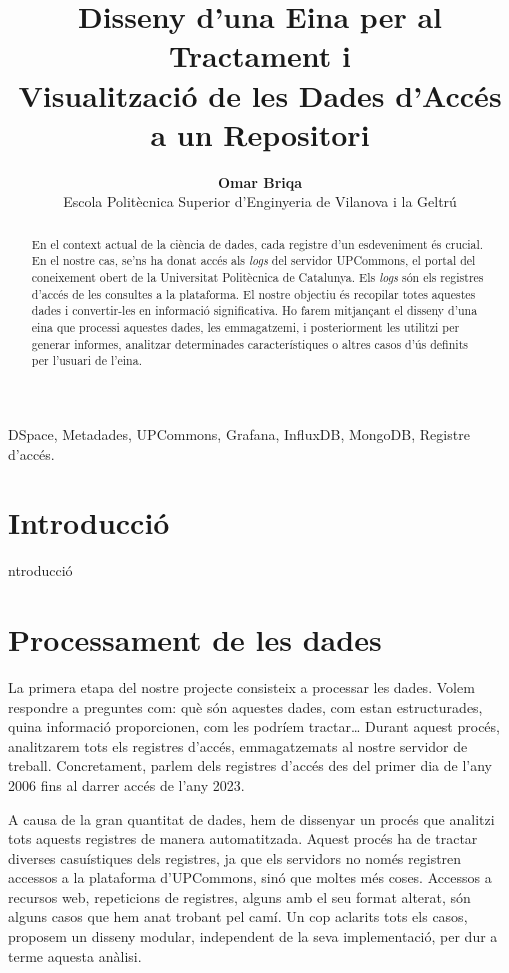 \documentclass[lettersize,journal]{IEEEtran}
\begin{document}
\title{Disseny d'una Eina per al Tractament i \\ Visualització de les Dades d'Accés a un Repositori}
\author{\textbf{Omar Briqa} \\ \vspace{5pt} Escola Politècnica Superior d'Enginyeria de Vilanova i la Geltrú}
\maketitle

\begin{abstract}
En el context actual de la ciència de dades, cada registre d'un esdeveniment és crucial.
En el nostre cas, se'ns ha donat accés als \textit{logs} del servidor UPCommons, el portal del coneixement obert de la Universitat Politècnica de Catalunya.
Els \textit{logs} són els registres d'accés de les consultes a la plataforma.
El nostre objectiu és recopilar totes aquestes dades i convertir-les en informació significativa.
Ho farem mitjançant el disseny d'una eina que processi aquestes dades, les emmagatzemi, i posteriorment les utilitzi per generar informes, analitzar determinades característiques o altres casos d'ús definits per l'usuari de l'eina.
\end{abstract}

\begin{IEEEkeywords}
    DSpace, Metadades, UPCommons, Grafana, InfluxDB, MongoDB, Registre d'accés.
\end{IEEEkeywords}


\section{Introducció}\label{sec:introduction}
 ntroducció

\section{Processament de les dades}\label{sec:data-processing}
La primera etapa del nostre projecte consisteix a processar les dades.
Volem respondre a preguntes com: què són aquestes dades, com estan estructurades, quina informació proporcionen, com les podríem tractar\dots
Durant aquest procés, analitzarem tots els registres d'accés, emmagatzemats al nostre servidor de treball.
Concretament, parlem dels registres d'accés des del primer dia de l'any 2006 fins al darrer accés de l'any 2023.

A causa de la gran quantitat de dades, hem de dissenyar un procés que analitzi tots aquests registres de manera automatitzada.
Aquest procés ha de tractar diverses casuístiques dels registres, ja que els servidors no només registren accessos a la plataforma d'UPCommons, sinó que moltes més coses.
Accessos a recursos web, repeticions de registres, alguns amb el seu format alterat, són alguns casos que hem anat trobant pel camí.
Un cop aclarits tots els casos, proposem un disseny modular, independent de la seva implementació, per dur a terme aquesta anàlisi.
\end{document}
